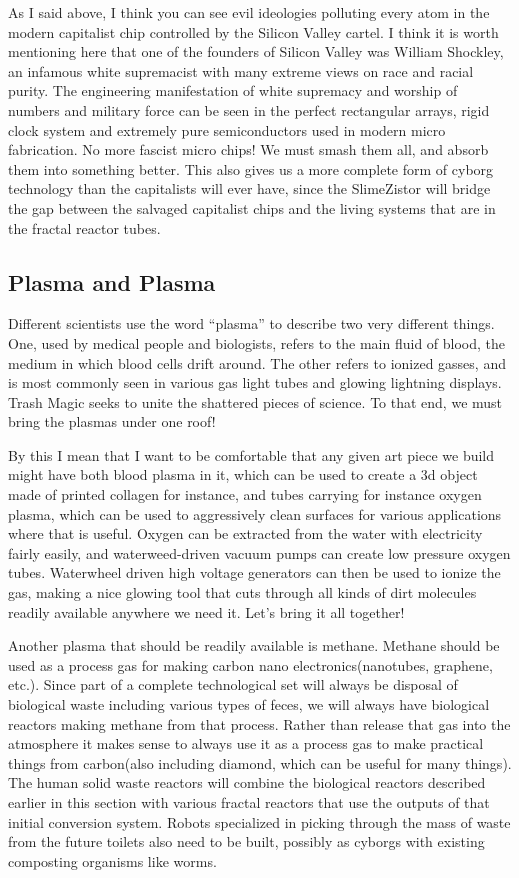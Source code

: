 As I said above, I think you can see evil ideologies polluting every
atom in the modern capitalist chip controlled by the Silicon Valley
cartel. I think it is worth mentioning here that one of the founders of
Silicon Valley was William Shockley, an infamous white supremacist with
many extreme views on race and racial purity. The engineering
manifestation of white supremacy and worship of numbers and military
force can be seen in the perfect rectangular arrays, rigid clock system
and extremely pure semiconductors used in modern micro fabrication. No
more fascist micro chips! We must smash them all, and absorb them into
something better. This also gives us a more complete form of cyborg
technology than the capitalists will ever have, since the SlimeZistor
will bridge the gap between the salvaged capitalist chips and the living
systems that are in the fractal reactor tubes.

\subsection{Plasma and Plasma}\label{plasma-and-plasma}

Different scientists use the word ``plasma'' to describe two very
different things. One, used by medical people and biologists, refers to
the main fluid of blood, the medium in which blood cells drift around.
The other refers to ionized gasses, and is most commonly seen in various
gas light tubes and glowing lightning displays. Trash Magic seeks to
unite the shattered pieces of science. To that end, we must bring the
plasmas under one roof!

By this I mean that I want to be comfortable that any given art piece we
build might have both blood plasma in it, which can be used to create a
3d object made of printed collagen for instance, and tubes carrying for
instance oxygen plasma, which can be used to aggressively clean surfaces
for various applications where that is useful. Oxygen can be extracted
from the water with electricity fairly easily, and waterweed-driven
vacuum pumps can create low pressure oxygen tubes. Waterwheel driven
high voltage generators can then be used to ionize the gas, making a
nice glowing tool that cuts through all kinds of dirt molecules readily
available anywhere we need it. Let's bring it all together!

Another plasma that should be readily available is methane. Methane
should be used as a process gas for making carbon nano
electronics(nanotubes, graphene, etc.). Since part of a complete
technological set will always be disposal of biological waste including
various types of feces, we will always have biological reactors making
methane from that process. Rather than release that gas into the
atmosphere it makes sense to always use it as a process gas to make
practical things from carbon(also including diamond, which can be useful
for many things). The human solid waste reactors will combine the
biological reactors described earlier in this section with various
fractal reactors that use the outputs of that initial conversion system.
Robots specialized in picking through the mass of waste from the future
toilets also need to be built, possibly as cyborgs with existing
composting organisms like worms.

